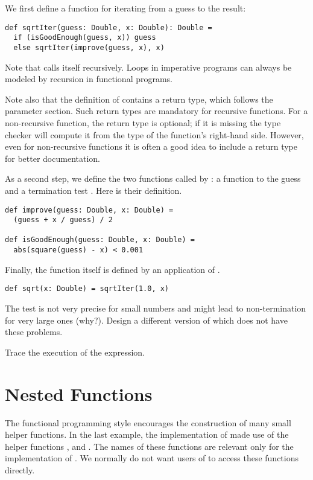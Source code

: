 We first define a function for iterating from a guess to the result:
\begin{lstlisting}
def sqrtIter(guess: Double, x: Double): Double =
  if (isGoodEnough(guess, x)) guess
  else sqrtIter(improve(guess, x), x)
\end{lstlisting}
Note that  calls itself recursively.  Loops in
imperative programs can always be modeled by recursion in functional
programs. 

Note also that the definition of  contains a return
type, which follows the parameter section. Such return types are
mandatory for recursive functions. For a non-recursive function, the
return type is optional; if it is missing the type checker will
compute it from the type of the function's right-hand side. However,
even for non-recursive functions it is often a good idea to include a
return type for better documentation.

As a second step, we define the two functions called by
: a function to  the guess and a
termination test . Here is their definition.
\begin{lstlisting}
def improve(guess: Double, x: Double) =
  (guess + x / guess) / 2

def isGoodEnough(guess: Double, x: Double) =
  abs(square(guess) - x) < 0.001
\end{lstlisting}

Finally, the  function itself is defined by an application
of .
\begin{lstlisting}
def sqrt(x: Double) = sqrtIter(1.0, x)
\end{lstlisting}

\begin{exercise} The  test is not very precise for small
numbers and might lead to non-termination for very large ones (why?).
Design a different version of  which does not have
these problems.
\end{exercise}

\begin{exercise} Trace the execution of the  expression.
\end{exercise}

\section{Nested Functions}

The functional programming style encourages the construction of many
small helper functions. In the last example, the implementation
of  made use of the helper functions ,
 and . The names of these functions
are relevant only for the implementation of . We normally
do not want users of  to access these functions directly.

